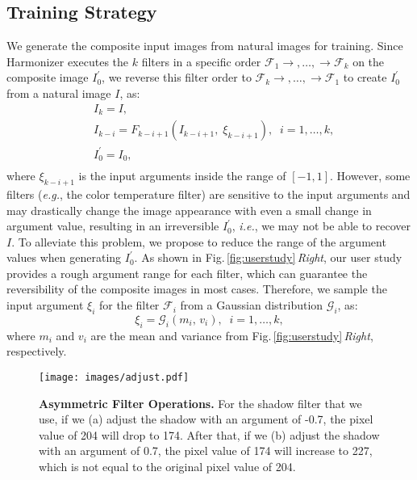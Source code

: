 \documentclass[runningheads]{llncs}
\newcommand{\ke}[1]{{\color{black}#1}}
\begin{document}
\subsection{Training Strategy}
We generate the composite input images from natural images for training.
Since Harmonizer executes the $k$ filters in a specific order $\mathcal{F}_{1}\to,\dots,\to\mathcal{F}_{k}$ on the composite image $I^{\prime}_0$, we reverse this filter order to $\mathcal{F}_{k}\to,\dots,\to\mathcal{F}_{1}$ to create $I^{\prime}_0$ from a natural image $I$, as:
\begin{equation}\label{eq:gt}
\begin{split}
    & I_{k} = I, \\
    & I_{k-i} = F_{k-i+1} (I_{k-i+1},\; \xi_{k-i+1}), \;\; i=1, \dots, k,\\
    & I^{\prime}_0 = I_0, \\
\end{split}
\end{equation}
where $\xi_{k-i+1}$ is the input arguments inside the range of $[-1, 1]$.
However, some filters ({\it e.g.}, the color temperature filter) are sensitive to the input arguments and may drastically change the image appearance with even a small change in argument value, resulting in an irreversible $I^{\prime}_0$, {\it i.e.}, we may not be able to recover $I$. 
To \ke{alleviate} this problem, we propose to reduce the range of the argument values
when generating $I^{\prime}_0$. As shown in Fig.\,\ref{fig:userstudy}\,\textit{Right}, our user study provides a rough argument range for each filter, which can guarantee the reversibility of the composite images \ke{in most cases}. Therefore, we sample the input argument $\xi_{i}$ for the filter $\mathcal{F}_{i}$ from a Gaussian distribution $\mathcal{G}_{i}$, as:
\begin{equation}
    \xi_{i} = \mathcal{G}_{i} (m_i, \, v_i), \;\; i=1, \dots, k,
\end{equation}
where $m_i$ and $v_i$ are the mean and variance from Fig.\,\ref{fig:userstudy}\,\textit{Right}, respectively. 


\begin{figure}[t]
\centering
\texttt{[image: images/adjust.pdf]}
{\begin{center}
\vspace{-0.5cm}
\caption{\textbf{Asymmetric Filter Operations.} For the shadow filter that we use, if we (a) adjust the shadow with an argument of -0.7, the pixel value of 204 will drop to 174. After that, if we (b) adjust the shadow with an argument of 0.7, the pixel value of 174 will increase to 227, which is not equal to the original pixel value of 204.}
\label{fig:shadow}
\end{center}
}
\vspace{-0.3cm}
\end{figure}
\end{document}

